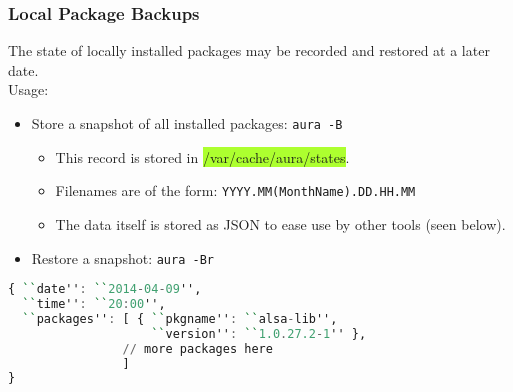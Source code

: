 \documentclass{article}
\begin{document}
\subsubsection{Local Package Backups}
The state of locally installed packages may be recorded and restored
at a later date.\\
Usage:
\begin{itemize}
\itemsep1pt\parskip0pt
\item Store a snapshot of all installed packages:
  \colorbox{Apricot}{\texttt{aura -B}}
  \begin{itemize}
    \item This record is stored in
      \colorbox{GreenYellow}{/var/cache/aura/states}.
    \item Filenames are of the form: \texttt{YYYY.MM(MonthName).DD.HH.MM}
    \item The data itself is stored as JSON to ease use by other tools
      (seen below).    
  \end{itemize}
\item Restore a snapshot: \colorbox{Apricot}{\texttt{aura -Br}}
\end{itemize}

\begin{shaded}
\begin{lstlisting}[language=haskell]
{ ``date'': ``2014-04-09'',
  ``time'': ``20:00'',
  ``packages'': [ { ``pkgname'': ``alsa-lib'',
                    ``version'': ``1.0.27.2-1'' },
                // more packages here
                ]
}
\end{lstlisting}
\end{shaded}

\end{document}

